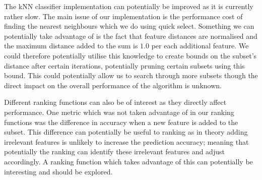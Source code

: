 The kNN classifier implementation can potentially be improved as it is currently rather slow. The main issue of our implementation is the performance cost of finding the nearest neighbours which we do using quick select. Something we can potentially take advantage of is the fact that feature distances are normalised and the maximum distance added to the sum is $1.0$ per each additional feature. We could therefore potentially utilise this knowledge to create bounds on the subset's distance after certain iterations, potentially pruning certain subsets using this bound. This could potentially allow us to search through more subsets though the direct impact on the overall performance of the algorithm is unknown.

Different ranking functions can also be of interest as they directly affect performance. One metric which was not taken advantage of in our ranking functions was the difference in accuracy when a new feature is added to the subset. This difference can potentially be useful to ranking as in theory adding irrelevant features is unlikely to increase the prediction accuracy; meaning that potentially the ranking can identify these irrelevant features and adjust accordingly. A ranking function which takes advantage of this can potentially be interesting and should be explored.
